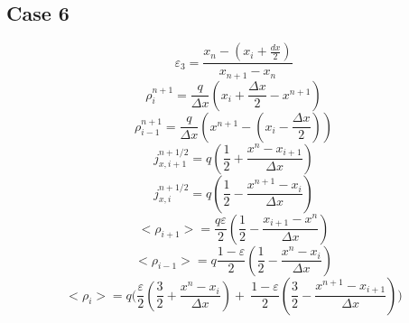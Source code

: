 \subsection{Case 6}
\begin{equation}
    \varepsilon_3 = \frac{x_n - (x_i + \frac{dx}{2})}{x_{n+1} - x_n}
\end{equation}
\begin{equation}
    \rho_i^{n+1} = \frac{q}{\Delta x} (x_i + \frac{\Delta x}{2} - x^{n+1})
\end{equation}
\begin{equation}
    \rho_{i-1}^{n+1} = \frac{q}{\Delta x} (x^{n+1} - (x_i - \frac{\Delta x}{2}))
\end{equation}
\begin{equation}
    j_{x,i+1}^{n+1/2} = q (\frac{1}{2} + \frac{x^n - x_{i+1}}{\Delta x})
\end{equation}
\begin{equation}
    j_{x,i}^{n+1/2} = q (\frac{1}{2} - \frac{x^{n+1} - x_i}{\Delta x})
\end{equation}
\begin{equation}
    <\rho_{i+1}> = \frac{q \varepsilon}{2} (\frac{1}{2} - \frac{x_{i+1} - x^n}{\Delta x})
\end{equation}
\begin{equation}
    <\rho_{i-1}> = q \frac{1- \varepsilon}{2} (\frac{1}{2} - \frac{x^n - x_i}{\Delta x})
\end{equation}
\begin{equation}
    <\rho_{i}> = q \Bigg(\frac{\varepsilon}{2} (\frac{3}{2} + \frac{x^n-x_i}{\Delta x}) +\
    \frac{1-\varepsilon}{2} (\frac{3}{2} - \frac{x^{n+1} - x_{i+1}}{\Delta x})\Bigg)
\end{equation}
